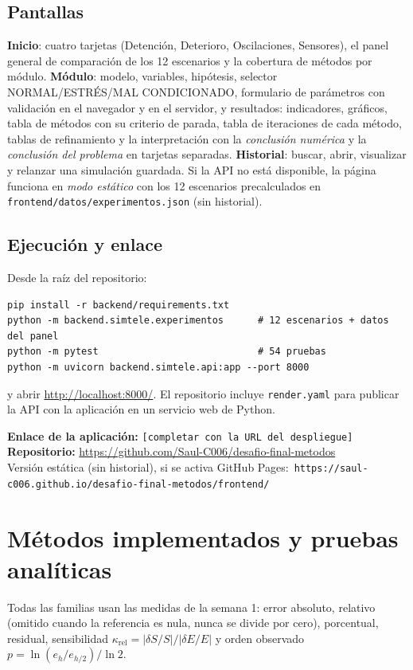 \documentclass[11pt,letterpaper]{article}
\newcommand{\caja}[1]{\par\noindent\colorbox{fondo}{\parbox{\dimexpr\linewidth-2\fboxsep}{#1}}\par}
\begin{document}
\subsection{Pantallas}
\textbf{Inicio}: cuatro tarjetas (Detención, Deterioro, Oscilaciones, Sensores), el panel general de comparación de los 12 escenarios y la cobertura de métodos por módulo. \textbf{Módulo}: modelo, variables, hipótesis, selector NORMAL/ESTRÉS/MAL CONDICIONADO, formulario de parámetros con validación en el navegador y en el servidor, y resultados: indicadores, gráficos, tabla de métodos con su criterio de parada, tabla de iteraciones de cada método, tablas de refinamiento y la interpretación con la \emph{conclusión numérica} y la \emph{conclusión del problema} en tarjetas separadas. \textbf{Historial}: buscar, abrir, visualizar y relanzar una simulación guardada. Si la API no está disponible, la página funciona en \emph{modo estático} con los 12 escenarios precalculados en \texttt{frontend/datos/experimentos.json} (sin historial).

\subsection{Ejecución y enlace}
Desde la raíz del repositorio:
\begin{verbatim}
pip install -r backend/requirements.txt
python -m backend.simtele.experimentos      # 12 escenarios + datos del panel
python -m pytest                            # 54 pruebas
python -m uvicorn backend.simtele.api:app --port 8000
\end{verbatim}
y abrir \url{http://localhost:8000/}. El repositorio incluye \texttt{render.yaml} para publicar la API con la aplicación en un servicio web de Python.

\caja{\textbf{Enlace de la aplicación:} \texttt{[completar con la URL del despliegue]}\\
\textbf{Repositorio:} \url{https://github.com/Saul-C006/desafio-final-metodos}\\
Versión estática (sin historial), si se activa GitHub Pages:\ \texttt{https://saul-c006.github.io/desafio-final-metodos/frontend/}}

\section{Métodos implementados y pruebas analíticas}
Todas las familias usan las medidas de la semana 1: error absoluto, relativo (omitido cuando la referencia es nula, nunca se divide por cero), porcentual, residual, sensibilidad $\kappa_{\mathrm{rel}}=|\delta S/S|/|\delta E/E|$ y orden observado $p=\ln(e_h/e_{h/2})/\ln 2$.
\end{document}
